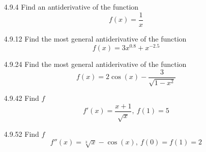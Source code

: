 \documentclass{article}
\begin{document}
\begin{enumerate}
\newpage

\item[4.9.4]
    Find an antiderivative of the function
    \[
        f(x) = \frac{1}{x}
    \]

\vspace{3cm}

\item[4.9.12]
    Find the most general antiderivative of the function
    \[
        f(x) = 3x^{0.8} + x^{-2.5}
    \]

\vspace{6cm}

\item[4.9.24]
    Find the most general antiderivative of the function
    \[
        f(x) = 2 \cos (x) - \frac{3}{\sqrt{1-x^{2}}}
    \]

\newpage

\item[4.9.42]
    Find $f$
    \[
        f'(x) = \frac{x+1}{\sqrt{x}},\ f(1) = 5
    \]

\vspace{6cm}

\item[4.9.52]
    Find $f$
    \[
        f''(x) = \sqrt[3]{x} - \cos (x),\ f(0) = f(1) = 2
    \]
\end{enumerate}
\end{document}
